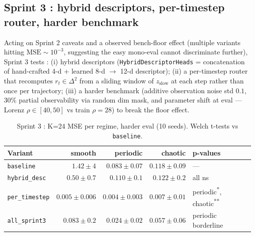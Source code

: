 \documentclass[11pt,a4paper]{article}
\begin{document}
\subsection{Sprint 3 : hybrid descriptors, per-timestep router, harder benchmark}
\label{sec:rwm-sprint3}

Acting on Sprint 2 caveats and a observed bench-floor effect
(multiple variants hitting $\mathrm{MSE} \sim 10^{-3}$, suggesting
the easy mono-eval cannot discriminate further), Sprint 3 tests :
(i) hybrid descriptors (\texttt{HybridDescriptorHeads} =
concatenation of hand-crafted 4-d + learned 8-d $\to$ 12-d
descriptor); (ii) a per-timestep router that recomputes
$r_t \in \Delta^2$ from a sliding window of $z_{\text{slow}}$ at
each step rather than once per trajectory; (iii) a harder
benchmark (additive observation noise std $0.1$, $30\%$ partial
observability via random dim mask, and parameter shift at eval
--- Lorenz $\rho \in [40, 50]$ vs train $\rho{=}28$) to break
the floor effect.

\begin{table}[h]
\centering
\caption{Sprint 3 : K=24 MSE per regime, harder eval (10 seeds).
Welch t-tests vs \texttt{baseline}.}
\label{tab:sprint3-summary}
\begin{tabular}{lrrrl}
\toprule
Variant & smooth & periodic & chaotic & p-values \\
\midrule
\texttt{baseline}    & $1.42 \pm 4$       & $0.083 \pm 0.07$    & $0.118 \pm 0.09$  & — \\
\texttt{hybrid\_desc}& $0.50 \pm 0.7$     & $0.110 \pm 0.1$     & $0.122 \pm 0.2$   & all ns \\
\texttt{per\_timestep}& $\bm{0.005 \pm 0.006}$ & $\bm{0.004 \pm 0.003}$ & $\bm{0.007 \pm 0.01}$ & periodic\textsuperscript{*}, chaotic\textsuperscript{**} \\
\texttt{all\_sprint3} & $0.083 \pm 0.2$    & $0.024 \pm 0.02$    & $0.057 \pm 0.06$  & periodic borderline \\
\bottomrule
\end{tabular}
\end{table}
\end{document}
